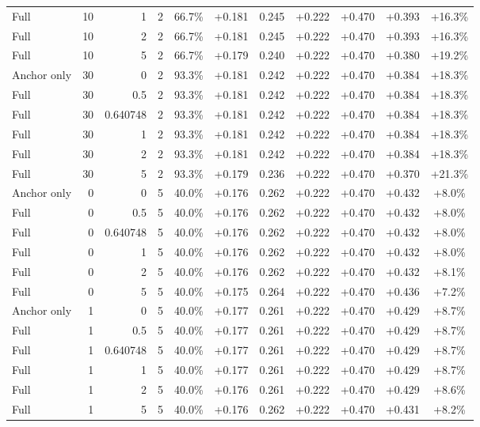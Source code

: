\begin{table}[htbp]
\begin{tabular}{lrrrccccccc}
Full & 10 & 1 & 2 & 66.7\% & +0.181 & 0.245 & +0.222 & +0.470 & +0.393 & +16.3\% \\
Full & 10 & 2 & 2 & 66.7\% & +0.181 & 0.245 & +0.222 & +0.470 & +0.393 & +16.3\% \\
Full & 10 & 5 & 2 & 66.7\% & +0.179 & 0.240 & +0.222 & +0.470 & +0.380 & +19.2\% \\
Anchor only & 30 & 0 & 2 & 93.3\% & +0.181 & 0.242 & +0.222 & +0.470 & +0.384 & +18.3\% \\
Full & 30 & 0.5 & 2 & 93.3\% & +0.181 & 0.242 & +0.222 & +0.470 & +0.384 & +18.3\% \\
Full & 30 & 0.640748 & 2 & 93.3\% & +0.181 & 0.242 & +0.222 & +0.470 & +0.384 & +18.3\% \\
Full & 30 & 1 & 2 & 93.3\% & +0.181 & 0.242 & +0.222 & +0.470 & +0.384 & +18.3\% \\
Full & 30 & 2 & 2 & 93.3\% & +0.181 & 0.242 & +0.222 & +0.470 & +0.384 & +18.3\% \\
Full & 30 & 5 & 2 & 93.3\% & +0.179 & 0.236 & +0.222 & +0.470 & +0.370 & +21.3\% \\
Anchor only & 0 & 0 & 5 & 40.0\% & +0.176 & 0.262 & +0.222 & +0.470 & +0.432 & +8.0\% \\
Full & 0 & 0.5 & 5 & 40.0\% & +0.176 & 0.262 & +0.222 & +0.470 & +0.432 & +8.0\% \\
Full & 0 & 0.640748 & 5 & 40.0\% & +0.176 & 0.262 & +0.222 & +0.470 & +0.432 & +8.0\% \\
Full & 0 & 1 & 5 & 40.0\% & +0.176 & 0.262 & +0.222 & +0.470 & +0.432 & +8.0\% \\
Full & 0 & 2 & 5 & 40.0\% & +0.176 & 0.262 & +0.222 & +0.470 & +0.432 & +8.1\% \\
Full & 0 & 5 & 5 & 40.0\% & +0.175 & 0.264 & +0.222 & +0.470 & +0.436 & +7.2\% \\
Anchor only & 1 & 0 & 5 & 40.0\% & +0.177 & 0.261 & +0.222 & +0.470 & +0.429 & +8.7\% \\
Full & 1 & 0.5 & 5 & 40.0\% & +0.177 & 0.261 & +0.222 & +0.470 & +0.429 & +8.7\% \\
Full & 1 & 0.640748 & 5 & 40.0\% & +0.177 & 0.261 & +0.222 & +0.470 & +0.429 & +8.7\% \\
Full & 1 & 1 & 5 & 40.0\% & +0.177 & 0.261 & +0.222 & +0.470 & +0.429 & +8.7\% \\
Full & 1 & 2 & 5 & 40.0\% & +0.176 & 0.261 & +0.222 & +0.470 & +0.429 & +8.6\% \\
Full & 1 & 5 & 5 & 40.0\% & +0.176 & 0.262 & +0.222 & +0.470 & +0.431 & +8.2\% \\

\end{tabular}
\end{table}
